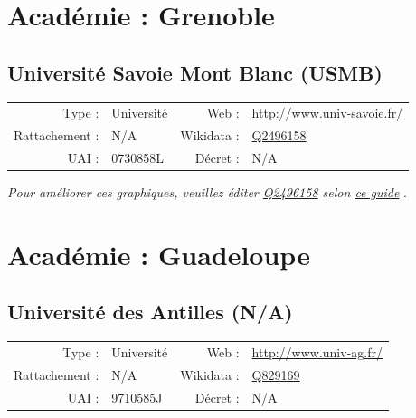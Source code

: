 \documentclass[11pt,french,landscape]{article}
\begin{document}
\newpage

\hypertarget{acaduxe9mie-grenoble}{%
\section{Académie : Grenoble}\label{acaduxe9mie-grenoble}}

\hypertarget{universituxe9-savoie-mont-blanc-usmb}{%
\subsection{Université Savoie Mont Blanc
(USMB)}\label{universituxe9-savoie-mont-blanc-usmb}}

\begin{tabular*}{0.45\textwidth}{rp{2cm}rl}  
\hline  
Type : & Université & Web : &\href{http://www.univ-savoie.fr/}{http://www.univ-savoie.fr/} \\  
Rattachement : & N/A & Wikidata : & \href{https://www.wikidata.org/entity/Q2496158}{Q2496158} \\  
UAI : & 0730858L & Décret : & N/A \\  
\hline  
\end{tabular*}

\textit{\scriptsize Pour améliorer ces graphiques, veuillez éditer \href{https://www.wikidata.org/entity/Q2496158}{Q2496158}  selon \href{https://github.com/cpesr/wikidataESR/blob/master/Rmd/wikidataESR.md}{ce guide}}
.


\newpage

\hypertarget{acaduxe9mie-guadeloupe}{%
\section{Académie : Guadeloupe}\label{acaduxe9mie-guadeloupe}}

\hypertarget{universituxe9-des-antilles-na}{%
\subsection{Université des Antilles
(N/A)}\label{universituxe9-des-antilles-na}}

\begin{tabular*}{0.45\textwidth}{rp{2cm}rl}  
\hline  
Type : & Université & Web : &\href{http://www.univ-ag.fr/}{http://www.univ-ag.fr/} \\  
Rattachement : & N/A & Wikidata : & \href{https://www.wikidata.org/entity/Q829169}{Q829169} \\  
UAI : & 9710585J & Décret : & N/A \\  
\hline  
\end{tabular*}
\end{document}
